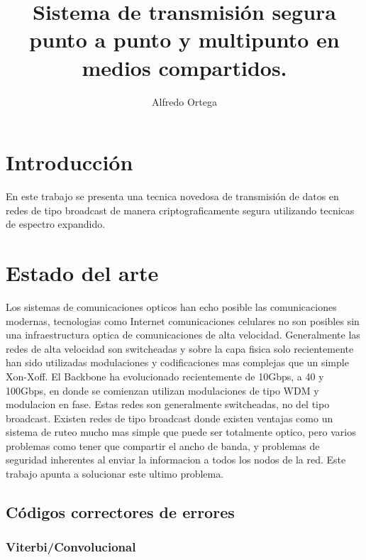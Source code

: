 \documentclass[12pt,twoside,openright]{moddalthesis}
\title{Sistema de transmisión segura punto a punto y multipunto en medios compartidos.}
\author{Alfredo Ortega}
\begin{document}
\maketitle
\newpage
\tableofcontents
\newpage

\section{Introducción}
En este trabajo se presenta una tecnica novedosa de transmisión de datos en redes de tipo broadcast de manera criptograficamente segura utilizando tecnicas de espectro expandido.



\section{Estado del arte}
Los sistemas de comunicaciones opticos han echo posible las comunicaciones modernas, tecnologias como Internet comunicaciones celulares no son posibles sin una infraestructura optica de comunicaciones de alta velocidad.
Generalmente las redes de alta velocidad son switcheadas y sobre la capa fisica solo recientemente han sido utilizadas modulaciones y codificaciones mas complejas que un simple Xon-Xoff.
El Backbone ha evolucionado recientemente de 10Gbps, a 40 y 100Gbps, en donde se comienzan utilizan modulaciones de tipo WDM y modulacion en fase. Estas redes son generalmente switcheadas, no del tipo broadcast.
Existen redes de tipo broadcast donde existen ventajas como un sistema de ruteo mucho mas simple que puede ser totalmente optico, pero varios problemas como tener que compartir el ancho de banda, y problemas de seguridad inherentes al enviar la informacion a todos los nodos de la red. Este trabajo apunta a solucionar este ultimo problema.

\subsection{Códigos correctores de errores}
\subsubsection{Viterbi/Convolucional}
\end{document}
